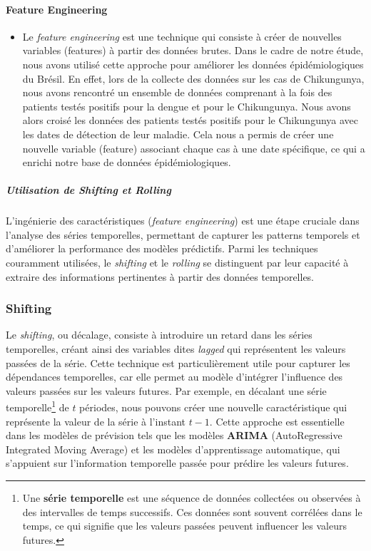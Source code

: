\paragraph*{Feature Engineering}
\begin{itemize}
	\item[\space] Le \textit{feature engineering} est une technique qui consiste à créer de nouvelles variables (features) à partir des données brutes. Dans le cadre de notre étude, nous avons utilisé cette approche pour améliorer les données épidémiologiques du Brésil. En effet, lors de la collecte des données sur les cas de Chikungunya, nous avons rencontré un ensemble de données comprenant à la fois des patients testés positifs pour la dengue et pour le Chikungunya. Nous avons alors croisé les données des patients testés positifs pour le Chikungunya avec les dates de détection de leur maladie. Cela nous a permis de créer une nouvelle variable (feature) associant chaque cas à une date spécifique, ce qui a enrichi notre base de données épidémiologiques.
\end{itemize}
\subparagraph{Utilisation de Shifting et Rolling}

L'ingénierie des caractéristiques (\textit{feature engineering}) est une étape cruciale dans l'analyse des séries temporelles, permettant de capturer les patterns temporels et d'améliorer la performance des modèles prédictifs. Parmi les techniques couramment utilisées, le \textit{shifting} et le \textit{rolling} se distinguent par leur capacité à extraire des informations pertinentes à partir des données temporelles.

\subsubsection*{Shifting}

Le \textit{shifting}, ou décalage, consiste à introduire un retard dans les séries temporelles, créant ainsi des variables dites \textit{lagged} qui représentent les valeurs passées de la série. Cette technique est particulièrement utile pour capturer les dépendances temporelles, car elle permet au modèle d'intégrer l'influence des valeurs passées sur les valeurs futures. Par exemple, en décalant une série temporelle\footnote{Une \textbf{série temporelle} est une séquence de données collectées ou observées à des intervalles de temps successifs. Ces données sont souvent corrélées dans le temps, ce qui signifie que les valeurs passées peuvent influencer les valeurs futures.} de $t$ périodes, nous pouvons créer une nouvelle caractéristique qui représente la valeur de la série à l'instant $t-1$. Cette approche est essentielle dans les modèles de prévision tels que les modèles \textbf{ARIMA} (AutoRegressive Integrated Moving Average) et les modèles d'apprentissage automatique, qui s'appuient sur l'information temporelle passée pour prédire les valeurs futures.

